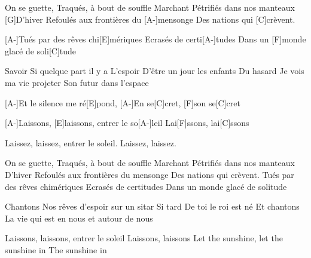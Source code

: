 
\begin{guitar}
 [A-]On se guette, Traqués, à bout de souffle
 Marchant Pétrifiés dans nos manteaux
 [G]D'hiver Refoulés aux frontières du 
 [A-]mensonge
 Des nations qui [C]crèvent.

 [A-]Tués par des rêves chi[E]mériques
 Ecrasés de certi[A-]tudes
 Dans un [F]monde glacé de soli[C]tude

Savoir Si quelque part il y a
L'espoir D'être un jour les enfants
Du hasard Je vois ma vie projeter
Son futur dans l'espace

[A-]Et le silence me ré[E]pond,
[A-]En se[C]cret, [F]son se[C]cret

[A-]Laissons, [E]laissons, entrer le so[A-]leil
Lai[F]ssons, lai[C]ssons

Laissez, laissez, entrer le soleil.
Laissez, laissez.

On se guette, Traqués, à bout de souffle
Marchant Pétrifiés dans nos manteaux
D'hiver Refoulés aux frontières du mensonge
Des nations qui crèvent.
Tués par des rêves chimériques
Ecrasés de certitudes
Dans un monde glacé de solitude

Chantons Nos rêves d'espoir sur un sitar
Si tard De toi le roi est né
Et chantons La vie qui est en nous et autour de nous

Laissons, laissons, entrer le soleil
Laissons, laissons
Let the sunshine, let the sunshine in
The sunshine in
\end{guitar}